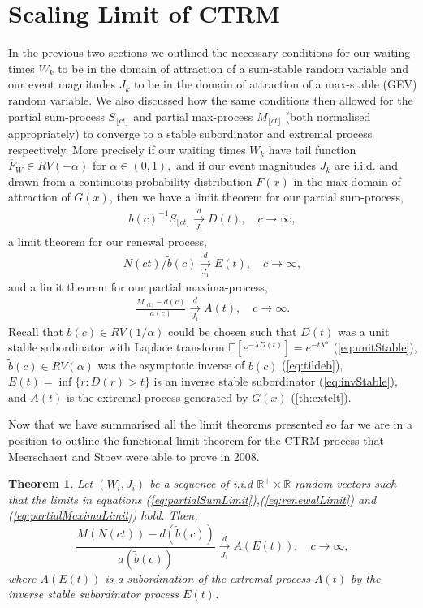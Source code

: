\documentclass[honours,12pt,twoside, openright]{unswthesis}
\newcommand{\E}{\mathbb{E}}
\newcommand{\1}{\mathbf 1}
\newcommand{\Floor}[1]{{\lfloor {#1} \rfloor}}
\newcommand{\cdj}{\overset{d}{\underset{J_1}{\longrightarrow}}}
\newtheorem{theorem}[equation]{Theorem}
\numberwithin{equation}{section}
\theoremstyle{definition}
\theoremstyle{remark}
\begin{document}
\section{Scaling Limit of CTRM}
In the previous two sections we outlined the necessary conditions for our waiting times $W_k$ to be in the domain of attraction of a sum-stable random variable and our event magnitudes $J_k$ to be in the domain of attraction of a max-stable (GEV) random variable. We also discussed how the same conditions then allowed for the partial sum-process $S_{\Floor{ct}}$ and partial max-process $M_{\Floor{ct}}$ (both normalised appropriately) to converge to a stable subordinator and extremal process respectively. More precisely if our waiting times $W_k$ have tail function $\overline F_W \in RV(-\alpha)$ for $\alpha\in(0,1),$ and if our event magnitudes $J_k$ are i.i.d. and drawn from a continuous probability distribution $F(x)$ in the max-domain of attraction of $G(x)$, then we have a limit theorem for our partial sum-process,
\begin{align}\label{eq:partialSumLimit}
	b(c)^{-1}S_\Floor{ct} \cdj D(t), \quad c \to \infty,
\end{align}
a limit theorem for our renewal process,
\begin{align}\label{eq:renewalLimit}
	N(ct) / \tilde b(c) \cdj E(t), \quad c \to \infty,
\end{align}
and a limit theorem for our partial maxima-process,
\begin{align}\label{eq:partialMaximaLimit}
	\frac{M_\Floor{ct}-d(c)}{a(c)} \cdj A(t), \quad c \to \infty.
\end{align}
Recall that $b(c)\in RV(1/\alpha)$ could be chosen such that $D(t)$ was a unit stable subordinator with Laplace transform $\E[e^{-\lambda D(t)}] = e^{-t \lambda^\alpha}$ (\ref{eq:unitStable}), $\tilde b(c) \in RV(\alpha)$ was the asymptotic inverse of $b(c)$ (\ref{eq:tildeb}), $E(t) = \inf\{r: D(r) > t\}$ is an inverse stable subordinator (\ref{eq:invStable}), and $A(t)$ is the extremal process generated by $G(x)$ (\ref{th:extclt}).

Now that we have summarised all the limit theorems presented so far we are in a position to outline the functional limit theorem for the CTRM process that Meerschaert and Stoev were able to prove in 2008.

\begin{theorem}\label{th:AEt} \cite{MeerschaertStoev08}
Let $(W_i,J_i)$ be a sequence of i.i.d $\mathbb{R}^+\times\mathbb{R}$ random vectors such that the limits in equations (\ref{eq:partialSumLimit}),(\ref{eq:renewalLimit}) and (\ref{eq:partialMaximaLimit}) hold. Then,
        \[
            \frac{M(N(ct))-d(\tilde{b}(c))}{a(\tilde{b}(c))} \cdj A(E(t)), \quad c\to\infty,
        \]
where $A(E(t))$ is a subordination of the extremal process $A(t)$ by the inverse stable subordinator process $E(t)$.\\
\end{theorem}
\end{document}
